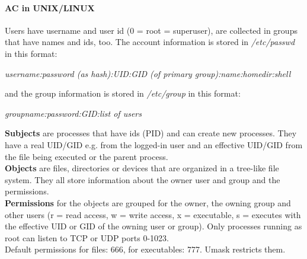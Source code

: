\documentclass[12pt]{article}
\begin{document}
	\paragraph{AC in UNIX/LINUX} Users have username and user id (0 = root = superuser), are collected in groups that have names and ids, too. The account information is stored in \textit{/etc/passwd} in this format:
	\begin{center}
		\textit{username:password (as hash):UID:GID (of primary group):name:homedir:shell}
	\end{center}
	and the group information is stored in \textit{/etc/group} in this format:
	\begin{center}
		\textit{groupname:password:GID:list of users}
	\end{center}
	\textbf{Subjects} are processes that have ids (PID) and can create new processes. They have a real UID/GID e.g. from the logged-in user and an effective UID/GID from the file being executed or the parent process.\\
	\textbf{Objects} are files, directories or devices that are organized in a tree-like file system. They all store information about the owner user and group and the permissions.\\
	\textbf{Permissions} for the objects are grouped for the owner, the owning group and other users (r = read access, w = write access, x = executable, s = executes with the effective UID or GID of the owning user or group). Only processes running as root can listen to TCP or UDP ports 0-1023.\\
	Default permissions for files: 666, for executables: 777. Umask restricts them.
	
\end{document}
